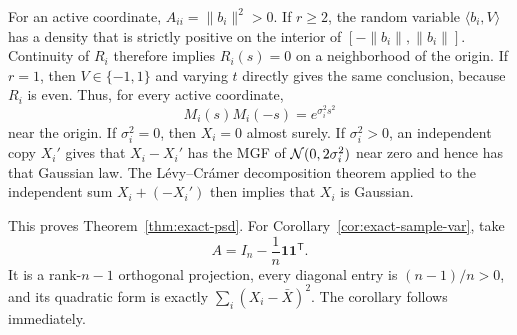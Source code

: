 For an active coordinate, $A_{ii}=\|b_i\|^2>0$. If $r\ge2$, the random variable $\langle b_i,V\rangle$ has a density that is strictly positive on the interior of $[-\|b_i\|,\|b_i\|]$. Continuity of $R_i$ therefore implies $R_i(s)=0$ on a neighborhood of the origin. If $r=1$, then $V\in\{-1,1\}$ and varying $t$ directly gives the same conclusion, because $R_i$ is even. Thus, for every active coordinate,
\[
M_i(s)M_i(-s)=e^{\sigma_i^2s^2}
\]
near the origin. If $\sigma_i^2=0$, then $X_i=0$ almost surely. If $\sigma_i^2>0$, an independent copy $X_i'$ gives that $X_i-X_i'$ has the MGF of $\mathcal N(0,2\sigma_i^2)$ near zero and hence has that Gaussian law. The L\'evy--Cr\'amer decomposition theorem applied to the independent sum $X_i+(-X_i')$ then implies that $X_i$ is Gaussian.

This proves Theorem~\ref{thm:exact-psd}. For Corollary~\ref{cor:exact-sample-var}, take
\[
A=I_n-\frac1n\mathbf 1\mathbf 1^{\mathsf T}.
\]
It is a rank-$n-1$ orthogonal projection, every diagonal entry is $(n-1)/n>0$, and its quadratic form is exactly $\sum_i(X_i-\bar X)^2$. The corollary follows immediately.
